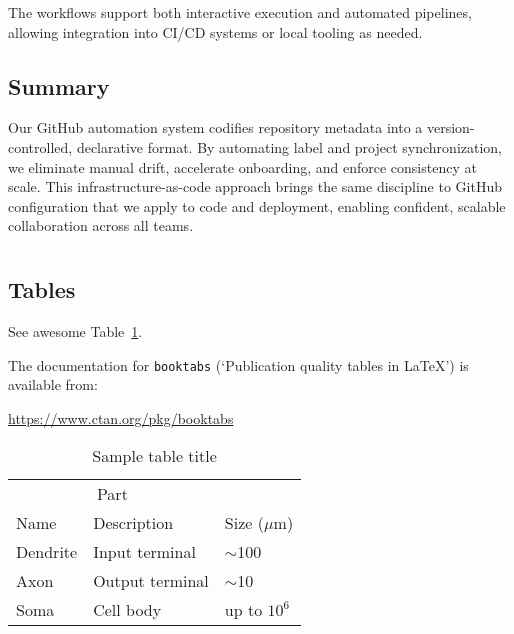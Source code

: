\documentclass{article}
\begin{document}
The workflows support both interactive execution and automated pipelines,
allowing integration into CI/CD systems or local tooling as needed.

\subsection{Summary}

Our GitHub automation system codifies repository metadata into a version-controlled,
declarative format. By automating label and project synchronization, we
eliminate manual drift, accelerate onboarding, and enforce consistency at scale.
This infrastructure-as-code approach brings the same discipline to GitHub configuration
that we apply to code and deployment, enabling confident, scalable collaboration
across all teams.

  \section{}


  \subsection{Tables}
  See awesome Table~\ref{tab:table}.

  The documentation for \verb+booktabs+ (`Publication quality tables in LaTeX')
  is available from:
  \begin{center}
    \url{https://www.ctan.org/pkg/booktabs}
  \end{center}

  \begin{table}
    \caption{Sample table title}
    \centering
    \begin{tabular}{lll}
      \toprule \multicolumn{2}{c}{Part} \\
      \cmidrule(r){1-2} Name           & Description     & Size ($\mu$m)  \\
      \midrule Dendrite                & Input terminal  & $\sim$100      \\
      Axon                             & Output terminal & $\sim$10       \\
      Soma                             & Cell body       & up to $10^{6}$ \\
      \bottomrule
    \end{tabular}
    \label{tab:table}
  \end{table}
\end{document}
